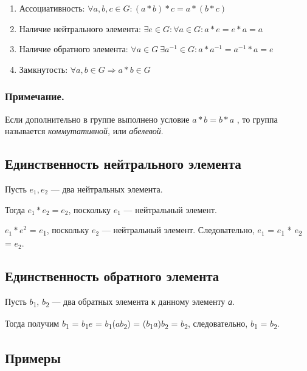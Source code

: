 \documentclass[12pt]{article}
\begin{document}
\begin{enumerate}
    \item
          Ассоциативность: $\forall a, b, c \in G: (a * b) * c = a * (b * c)$

    \item
          Наличие нейтрального элемента: $\exists e \in G : \forall a \in G: a * e = e * a = a$

    \item
          Наличие обратного элемента: $\forall a \in G \ \exists a^{−1}\in G: a * a^{−1} = a^{−1} * a = e$

    \item
          Замкнутость: $\forall a, b \in G \Rightarrow a * b \in G$
\end{enumerate}

\subsubsection{Примечание.}

Если дополнительно в группе выполнено условие $a * b = b * a$ , то группа
называется \emph{коммутативной}, или \emph{абелевой}.

\subsection{Единственность нейтрального элемента}

Пусть $e_{1}, e_{2}$ --- два нейтральных элемента.

Тогда $e_{1} * e_{2} = e_{2}$, поскольку $e_{1}$ --- нейтральный элемент.

$e_{1} * e^2$ = $e$\textsubscript{1}, поскольку
$e_{2}$ --- нейтральный элемент. Следовательно,
$e_{1}$ = $e$\textsubscript{1} * $e$\textsubscript{2} =
$e_{2}$.

\subsection{Единственность обратного
    элемента}

Пусть $b$\textsubscript{1}, $b$\textsubscript{2} --- два обратных элемента к
данному элементу \emph{а}.

Тогда получим $b$\textsubscript{1} = $b$\textsubscript{1}$e$ =
$b$\textsubscript{1}($a$$b$\textsubscript{2}) =
($b$\textsubscript{1}$a$)$b$\textsubscript{2} = $b$\textsubscript{2},
следовательно, $b$\textsubscript{1} = $b$\textsubscript{2}.

\subsection{Примеры}
\end{document}
